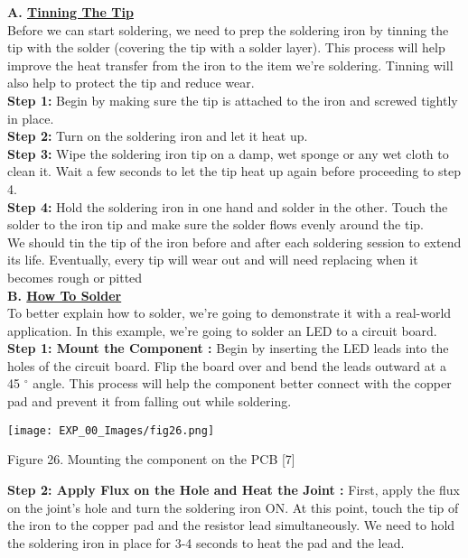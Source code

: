 \documentclass[12pt,a4paper]{article}
\begin{document}
\begin{justify}
\noindent \textbf{A. \underline{Tinning The Tip}}\\[6pt]
\noindent Before we can start soldering, we need to prep the soldering iron by tinning the tip with the solder (covering the tip with a solder layer). This process will help improve the heat transfer from the iron to the item we're soldering. Tinning will also help to protect the tip and reduce wear.\\[5pt]
\textbf{Step 1:} Begin by making sure the tip is attached to the iron and screwed tightly in place. \\
\textbf{Step 2:} Turn on the soldering iron and let it heat up.\\
\textbf{Step 3:} Wipe the soldering iron tip on a damp, wet sponge or any wet cloth to clean it. Wait a few seconds to let the tip heat up again before proceeding to step 4. \\
\textbf{Step 4:} Hold the soldering iron in one hand and solder in the other. Touch the solder to the iron tip and make sure the solder flows evenly around the tip.\\
We should tin the tip of the iron before and after each soldering session to extend its life. Eventually, every tip will wear out and will need replacing when it becomes rough or pitted\\

\noindent  \textbf{B. \underline{How To Solder}}\\[6pt]
\noindent To better explain how to solder, we're going to demonstrate it with a real-world application. In this example, we're going to solder an LED to a circuit board.\\

\noindent \textbf{Step 1: Mount the Component :}  Begin by inserting the LED leads into the holes of the circuit board. Flip the board over and bend the leads outward at a 45 $^{\circ}$  angle. This process will help the component better connect with the copper pad and prevent it from falling out while soldering.


\begin{center} 
\texttt{[image: EXP\_00\_Images/fig26.png]}
\end{center}
\vspace{-8mm}
\begin{center} {Figure 26. Mounting the component on the PCB [7]}\end{center}

\noindent \textbf{Step 2: Apply Flux on the Hole and Heat the Joint  :}
First, apply the flux on the joint's hole and turn the soldering iron ON. At this point, touch the tip of the iron to the copper pad and the resistor lead simultaneously. We need to hold the soldering iron in place for 3-4 seconds to heat the pad and the lead.



\end{justify}
\end{document}
